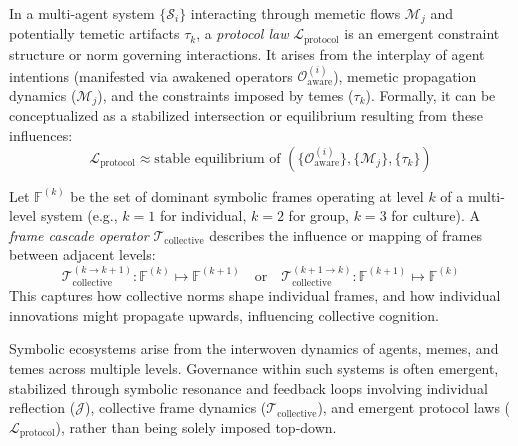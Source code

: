 \begin{definition}
\label{definition:bk9_protocol_law}
In a multi-agent system $\{\mathcal{S}_i\}$ interacting through memetic flows $\mathcal{M}_j$ and potentially temetic artifacts $\tau_k$, a \emph{protocol law} $\mathcal{L}_{\text{protocol}}$ is an emergent constraint structure or norm governing interactions. It arises from the interplay of agent intentions (manifested via awakened operators $\mathcal{O}^{(i)}_{\text{aware}}$), memetic propagation dynamics ($\mathcal{M}_j$), and the constraints imposed by temes ($\tau_k$). Formally, it can be conceptualized as a stabilized intersection or equilibrium resulting from these influences:
\[
\mathcal{L}_{\text{protocol}} \approx \text{stable equilibrium of } (\{\mathcal{O}^{(i)}_{\text{aware}}\}, \{\mathcal{M}_j\}, \{\tau_k\})
\]
\end{definition}
\begin{definition}
\label{definition:bk9_frame_cascade}
Let $\mathbb{F}^{(k)}$ be the set of dominant symbolic frames operating at level $k$ of a multi-level system (e.g., $k=1$ for individual, $k=2$ for group, $k=3$ for culture). A \emph{frame cascade operator} $\mathcal{T}_{\text{collective}}$ describes the influence or mapping of frames between adjacent levels:
\[
\mathcal{T}_{\text{collective}}^{(k \to k+1)} : \mathbb{F}^{(k)} \mapsto \mathbb{F}^{(k+1)} \quad \text{or} \quad \mathcal{T}_{\text{collective}}^{(k+1 \to k)} : \mathbb{F}^{(k+1)} \mapsto \mathbb{F}^{(k)}
\]
This captures how collective norms shape individual frames, and how individual innovations might propagate upwards, influencing collective cognition.
\end{definition}
\begin{remark}
\label{remark:bk9_ecosystem_regulation}
Symbolic ecosystems arise from the interwoven dynamics of agents, memes, and temes across multiple levels. Governance within such systems is often emergent, stabilized through symbolic resonance and feedback loops involving individual reflection ($\mathcal{J}$), collective frame dynamics ($\mathcal{T}_{\text{collective}}$), and emergent protocol laws ($\mathcal{L}_{\text{protocol}}$), rather than being solely imposed top-down.
\end{remark}
